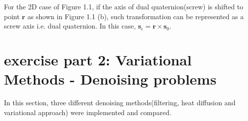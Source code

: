\documentclass[paper=a4, fontsize=11pt]{scrartcl} %
\numberwithin{equation}{section} %
\numberwithin{figure}{section} %
\numberwithin{table}{section} %
\renewcommand{\vec}[1]{\mathbf{#1}}
\begin{document}
\begin{itemize}
	For the 2D case of Figure 1.1, if the axis of dual quaternion(screw) is shifted to point $\vec{r}$ as shown in Figure 1.1 (b), such transformation can be represented as a screw axis i.e. dual quaternion. In this case, $\vec{s}_\epsilon = \vec{r} \times \vec{s}_0$. \cite{kavan2008geometric}
	
\end{itemize}

\pagebreak


\section{exercise part 2: Variational Methods - Denoising problems}

In this section, three different denoising methods(filtering, heat diffusion and variational approach) were implemented and compared.
\end{document}

